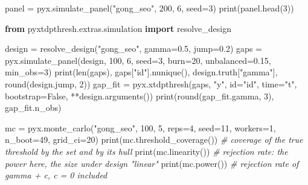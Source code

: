\documentclass[
  10.5pt,
  a4paper,
]{article}
\newenvironment{Shaded}{}{}
\newcommand{\BuiltInTok}[1]{\textcolor[rgb]{0.00,0.50,0.00}{#1}}
\newcommand{\CommentTok}[1]{\textcolor[rgb]{0.38,0.63,0.69}{\textit{#1}}}
\newcommand{\DecValTok}[1]{\textcolor[rgb]{0.25,0.63,0.44}{#1}}
\newcommand{\FloatTok}[1]{\textcolor[rgb]{0.25,0.63,0.44}{#1}}
\newcommand{\ImportTok}[1]{\textcolor[rgb]{0.00,0.50,0.00}{\textbf{#1}}}
\newcommand{\NormalTok}[1]{#1}
\newcommand{\OperatorTok}[1]{\textcolor[rgb]{0.40,0.40,0.40}{#1}}
\newcommand{\StringTok}[1]{\textcolor[rgb]{0.25,0.44,0.63}{#1}}
\newcommand{\VariableTok}[1]{\textcolor[rgb]{0.10,0.09,0.49}{#1}}
\begin{document}
\begin{Shaded}
\begin{Highlighting}[]
\NormalTok{panel }\OperatorTok{=}\NormalTok{ pyx.simulate\_panel(}\StringTok{"gong\_seo"}\NormalTok{, }\DecValTok{200}\NormalTok{, }\DecValTok{6}\NormalTok{, seed}\OperatorTok{=}\DecValTok{3}\NormalTok{)}
\BuiltInTok{print}\NormalTok{(panel.head(}\DecValTok{3}\NormalTok{))}

\ImportTok{from}\NormalTok{ pyxtdpthresh.extras.simulation }\ImportTok{import}\NormalTok{ resolve\_design}

\NormalTok{design }\OperatorTok{=}\NormalTok{ resolve\_design(}\StringTok{"gong\_seo"}\NormalTok{, gamma}\OperatorTok{=}\FloatTok{0.5}\NormalTok{, jump}\OperatorTok{=}\FloatTok{0.2}\NormalTok{)}
\NormalTok{gaps }\OperatorTok{=}\NormalTok{ pyx.simulate\_panel(design, }\DecValTok{100}\NormalTok{, }\DecValTok{6}\NormalTok{, seed}\OperatorTok{=}\DecValTok{3}\NormalTok{, burn}\OperatorTok{=}\DecValTok{20}\NormalTok{, unbalanced}\OperatorTok{=}\FloatTok{0.15}\NormalTok{, min\_obs}\OperatorTok{=}\DecValTok{3}\NormalTok{)}
\BuiltInTok{print}\NormalTok{(}\BuiltInTok{len}\NormalTok{(gaps), gaps[}\StringTok{"id"}\NormalTok{].nunique(), design.truth[}\StringTok{"gamma"}\NormalTok{], }\BuiltInTok{round}\NormalTok{(design.jump, }\DecValTok{2}\NormalTok{))}
\NormalTok{gap\_fit }\OperatorTok{=}\NormalTok{ pyx.xtdpthresh(gaps, }\StringTok{"y"}\NormalTok{, }\BuiltInTok{id}\OperatorTok{=}\StringTok{"id"}\NormalTok{, time}\OperatorTok{=}\StringTok{"t"}\NormalTok{, bootstrap}\OperatorTok{=}\VariableTok{False}\NormalTok{, }\OperatorTok{**}\NormalTok{design.arguments())}
\BuiltInTok{print}\NormalTok{(}\BuiltInTok{round}\NormalTok{(gap\_fit.gamma, }\DecValTok{3}\NormalTok{), gap\_fit.n\_obs)}

\NormalTok{mc }\OperatorTok{=}\NormalTok{ pyx.monte\_carlo(}\StringTok{"gong\_seo"}\NormalTok{, }\DecValTok{100}\NormalTok{, }\DecValTok{5}\NormalTok{, reps}\OperatorTok{=}\DecValTok{4}\NormalTok{, seed}\OperatorTok{=}\DecValTok{11}\NormalTok{, workers}\OperatorTok{=}\DecValTok{1}\NormalTok{, n\_boot}\OperatorTok{=}\DecValTok{49}\NormalTok{, grid\_ci}\OperatorTok{=}\DecValTok{20}\NormalTok{)}
\BuiltInTok{print}\NormalTok{(mc.threshold\_coverage())  }\CommentTok{\# coverage of the true threshold by the set and by its hull}
\BuiltInTok{print}\NormalTok{(mc.linearity())  }\CommentTok{\# rejection rate: the power here, the size under design "linear"}
\BuiltInTok{print}\NormalTok{(mc.power())  }\CommentTok{\# rejection rate of gamma + c, c = 0 included}


\end{Highlighting}
\end{Shaded}
\end{document}
